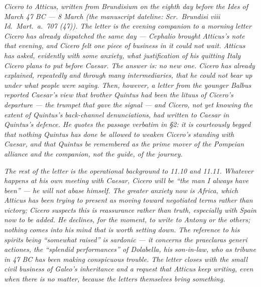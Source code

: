
\textit{Cicero to Atticus, written from Brundisium on the
eighth day before the Ides of March 47 BC --- 8 March
(the manuscript dateline: \textit{Scr.\ Brundisi viii
Id.\ Mart.\ a.\ 707 (47)}). The letter is the evening
companion to a morning letter Cicero has already
dispatched the same day --- Cephalio brought Atticus's
note that evening, and Cicero felt one piece of business
in it could not wait. Atticus has asked, evidently with
some anxiety, what justification of his quitting Italy
Cicero plans to put before Caesar. The answer is: no new
one. Cicero has already explained, repeatedly and
through many intermediaries, that he could not bear up
under what people were saying. Then, however, a letter
from the younger Balbus reported Caesar's view that
brother Quintus had been the \textit{lituus} of Cicero's
departure --- the trumpet that gave the signal --- and
Cicero, not yet knowing the extent of Quintus's
back-channel denunciations, had written to Caesar in
Quintus's defence. He quotes the passage verbatim in
\S2: it is courteously begged that nothing Quintus has
done be allowed to weaken Cicero's standing with Caesar,
and that Quintus be remembered as the prime mover of the
Pompeian alliance and the companion, not the guide, of
the journey.}

\textit{The rest of the letter is the operational
background to 11.10 and 11.11. Whatever happens at his
own meeting with Caesar, Cicero will be ``the man I
always have been'' --- he will not abase himself. The
greater anxiety now is Africa, which Atticus has been
trying to present as moving toward negotiated terms
rather than victory; Cicero suspects this is reassurance
rather than truth, especially with Spain now to be added.
He declines, for the moment, to write to Antony or the
others; nothing comes into his mind that is worth
setting down. The reference to his spirits being
``somewhat raised'' is sardonic --- it concerns the
\textit{praeclaras generi actiones}, the ``splendid
performances'' of Dolabella, his son-in-law, who as
tribune in 47 BC has been making conspicuous trouble.
The letter closes with the small civil business of
Galeo's inheritance and a request that Atticus keep
writing, even when there is no matter, because the
letters themselves bring something.}
